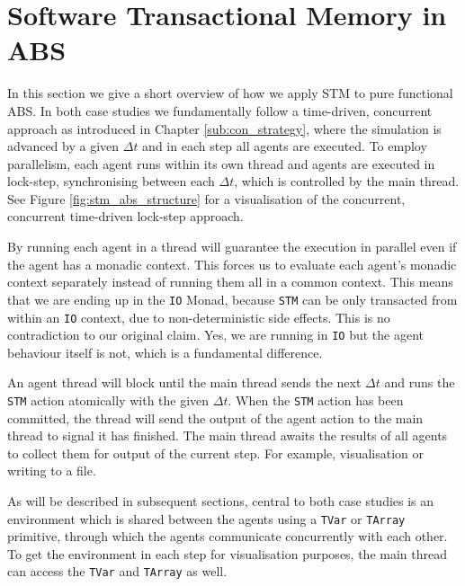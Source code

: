 \section{Software Transactional Memory in ABS}
\label{sec:stm_abs}
In this section we give a short overview of how we apply STM to pure functional ABS. In both case studies we fundamentally follow a time-driven, concurrent approach as introduced in Chapter \ref{sub:con_strategy}, where the simulation is advanced by a given $\Delta t$ and in each step all agents are executed. To employ parallelism, each agent runs within its own thread and agents are executed in lock-step, synchronising between each $\Delta t$, which is controlled by the main thread. See Figure \ref{fig:stm_abs_structure} for a visualisation of the concurrent, concurrent time-driven lock-step approach.

By running each agent in a thread will guarantee the execution in parallel even if the agent has a monadic context. This forces us to evaluate each agent's monadic context separately instead of running them all in a common context. This means that we are ending up in the \texttt{IO} Monad, because \texttt{STM} can be only transacted from within an \texttt{IO} context, due to non-deterministic side effects. This is no contradiction to our original claim. Yes, we are running in \texttt{IO} but the agent behaviour itself is not, which is a fundamental difference.

An agent thread will block until the main thread sends the next $\Delta t$ and runs the \texttt{STM} action atomically with the given $\Delta t$. When the \texttt{STM} action has been committed, the thread will send the output of the agent action to the main thread to signal it has finished. The main thread awaits the results of all agents to collect them for output of the current step. For example, visualisation or writing to a file.

As will be described in subsequent sections, central to both case studies is an environment which is shared between the agents using a \texttt{TVar} or \texttt{TArray} primitive, through which the agents communicate concurrently with each other. To get the environment in each step for visualisation purposes, the main thread can access the \texttt{TVar} and \texttt{TArray} as well. 

